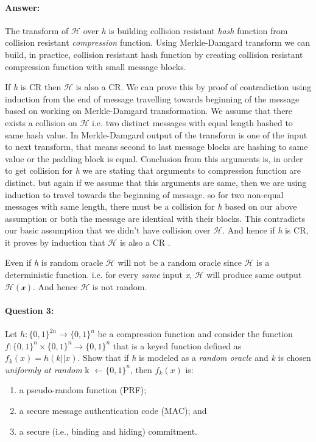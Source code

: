 \documentclass{article}
\begin{document}
    \paragraph{Answer: \newline}
        The transform of $\mathcal{H}$ over \emph{h} is building collision resistant \emph{hash} function from collision resistant \emph{compression} function. Using Merkle-Damgard transform we can build, in practice, collision resistant hash function by creating collision resistant compression function with small message blocks.\newline
        
        If \emph{h} is CR then $\mathcal{H}$ is also a CR. We can prove this by proof of contradiction using induction from the end of message travelling towards beginning of the message based on working on Merkle-Damgard transformation. \newline
        We assume that there exists a collision on $\mathcal{H}$ i.e. two distinct messages with equal length hashed to same hash value. 
        In Merkle-Damgard output of the transform is one of the input to next transform, that means second to last message blocks are hashing to same value or the padding block is equal. Conclusion from this arguments is, in order to get collision for \emph{h} we are stating that arguments to compression function are distinct. but again if we assume that this arguments are same, then we are using induction to travel towards the beginning of message. so for two non-equal messages with same length, there must be a collision for \emph{h} based on our above assumption or both the message are identical with their blocks. This contradicts our basic assumption that we didn't have collision over $\mathcal{H}$. And hence if \emph{h} is CR, it proves by induction that $\mathcal{H}$ is also a CR \cite{mdpbyprofDanBoneh}.\newline
        
        Even if \emph{h} is random oracle $\mathcal{H}$ will not be a random oracle since $\mathcal{H}$ is a deterministic function. i.e. for every \emph{same} input \emph{x}, $\mathcal{H}$ will produce same output $\mathcal{H(x)}$. And hence $\mathcal{H}$ is not random.
        
        
    \paragraph{Question 3:} Let $h:{\{0,1\}}^{2n} \rightarrow {\{0,1\}}^n$ be a compression function and consider the function $f:{\{0,1\}}^n \times{{\{0,1\}}^n} \rightarrow {\{0,1\}}^n$ that is a keyed function defined as $f_k{(x)} = h(k||x)$. Show that if \emph{h} is modeled as a \emph{random oracle} and \emph{k} is chosen \emph{uniformly at random} k $\leftarrow {\{0,1\}}^n$, then $f_k{(x)}$ is:
        \begin{enumerate}
            \item a pseudo-random function (PRF);
            \item a secure message authentication code (MAC); and
            \item a secure (i.e., binding and hiding) commitment.
        \end{enumerate}
        
\end{document}
